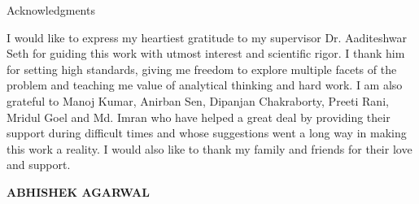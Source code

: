 \begin{center}
\LARGE{Acknowledgments} 
\end{center}

\vspace{0.5in}

I would like to express my heartiest gratitude to my supervisor Dr. Aaditeshwar Seth for guiding this work with utmost interest and scientific rigor. I thank him for setting high standards, giving me freedom to explore multiple facets of the problem and teaching me value of analytical thinking and hard work. I am also grateful to Manoj Kumar, Anirban Sen, Dipanjan Chakraborty, Preeti Rani, Mridul Goel and Md. Imran who have helped a great deal by providing their support during difficult times and whose suggestions went a long way in making this work a reality. I would also like to thank my family and friends for their love and support.\\

\vspace{1.5in}

{\bfseries ABHISHEK AGARWAL}

